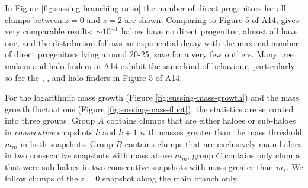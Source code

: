 In Figure \ref{fig:sussing-branching-ratio} the number of direct progenitors for all clumps between
$z = 0$ and $z = 2$ are shown. Comparing to Figure 5 of A14, \acacia gives very comparable
results: $\sim 10^{-1}$ haloes have no direct progenitor, almost all have one, and the distribution
follows an exponential decay with the maximal number of direct progenitors lying around 20-25, save
for a very few outliers. Many tree makers and halo finders in A14 exhibit the same kind of
behaviour, particularly so for the , , and  halo
finders in Figure 5 of A14.


For the logarithmic mass growth (Figure \ref{fig:sussing-mass-growth}) and the mass growth
fluctuations (Figure \ref{fig:sussing-mass-fluct}), the statistics are separated into three groups.
Group $A$ contains clumps that are either haloes or sub-haloes in \emph{consecutive} snapshots $k$
and $k+1$ with masses greater than the mass threshold $m_m$ in both snapshots. Group $B$ contains
clumps that are exclusively main haloes in two consecutive snapshots with mass above $m_{m}$, group
$C$ contains only clumps that were sub-haloes in two consecutive snapshots with mass greater than
$m_{s}$. We follow clumps of the $z = 0$ snapshot along the main branch only.

